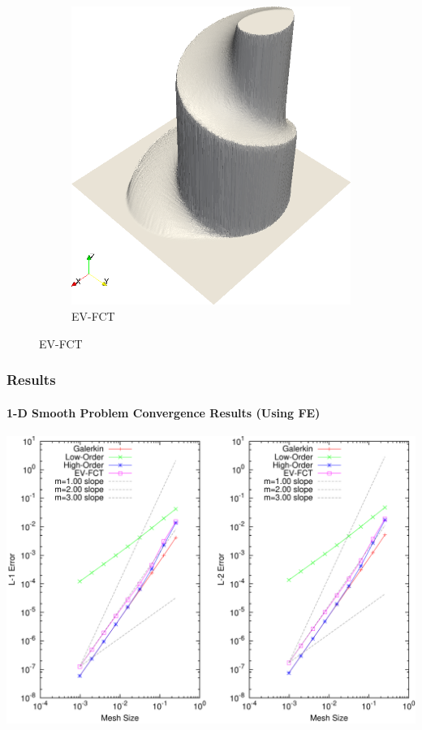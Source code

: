 \documentclass{beamer}
\begin{document}
\begin{frame}
\begin{figure}[h]
\begin{subfigure}{0.4\textwidth}
      \includegraphics[width=\textwidth]{./figures/EV-FCT_rotation.png}
      \caption{EV-FCT}
   \end{subfigure}
\end{figure}

\end{frame}
\begin{frame}
\frametitle{Results}
\framesubtitle{1-D Smooth Problem Convergence Results (Using FE)}

\includegraphics[width=\textwidth]{./figures/convergence_smooth_FE.pdf}

\end{frame}
\end{document}
